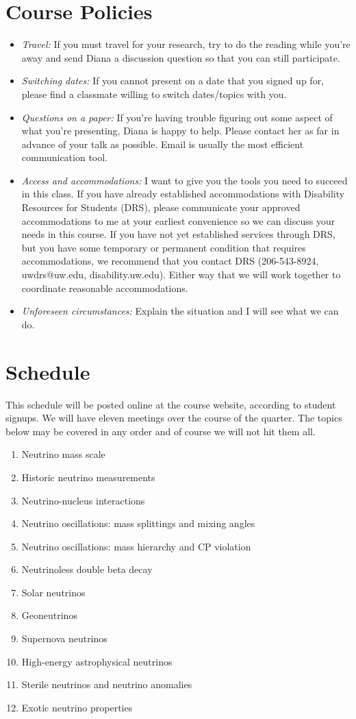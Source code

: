 \documentclass[12pt]{amsart}
\begin{document}
\section{Course Policies}
\begin{itemize}
	\item	\textit{Travel:} If you must travel for your research, try to do the reading while you're away and send Diana a discussion question so that you can still participate.
	\item	\textit{Switching dates:} If you cannot present on a date that you signed up for, please find a classmate willing to switch dates/topics with you.
	\item	\textit{Questions on a paper:} If you're having trouble figuring out some aspect of what you're presenting, Diana is happy to help. Please contact her as far in advance of your talk as possible. Email is usually the most efficient communication tool.
	\item	\textit{Access and accommodations:} I want to give you the tools you need to succeed in this class. If you have already established accommodations with Disability Resources for Students (DRS), please communicate your approved accommodations to me at your earliest convenience so we can discuss your needs in this course. If you have not yet established services through DRS, but you have some temporary or permanent condition that requires accommodations, we recommend that you contact DRS (206-543-8924, uwdrs@uw.edu, disability.uw.edu). Either way that we will work together to coordinate reasonable accommodations.
	\item	\textit{Unforeseen circumstances:} Explain the situation and I will see what we can do.
\end{itemize}

\section{Schedule}
This schedule will be posted online at the course website, according to student signups. We will have eleven meetings over the course of the quarter.   The topics below may be covered in any order and of course we will not hit them all.

\begin{enumerate}
	\item Neutrino mass scale
	\item Historic neutrino measurements
	\item	Neutrino-nucleus interactions 
	\item	Neutrino oscillations: mass splittings and mixing angles
	\item Neutrino oscillations: mass hierarchy and CP violation
	\item	Neutrinoless double beta decay
	\item Solar neutrinos
	\item	Geoneutrinos
	\item	Supernova neutrinos
	\item	High-energy astrophysical neutrinos
	\item	Sterile neutrinos and neutrino anomalies
	\item	Exotic neutrino properties
\end{enumerate}
\end{document}
